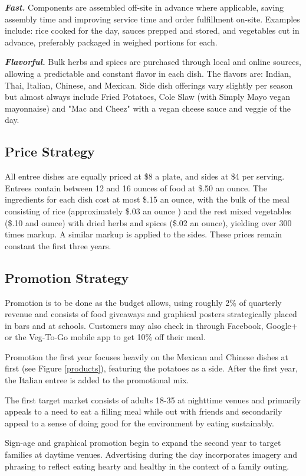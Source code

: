 \documentclass[12pt, letterpaper]{article}
\begin{document}
\textbf{\emph{Fast.}} Components are assembled off-site in advance where applicable, saving assembly time and improving service time and order fulfillment on-site. Examples include: rice cooked for the day, sauces prepped and stored, and vegetables cut in advance, preferably packaged in weighed portions for each. 

\textbf{\emph{Flavorful.}} Bulk herbs and spices are purchased through local and online sources, allowing a predictable and constant flavor in each dish.  The flavors are: Indian, Thai, Italian, Chinese, and Mexican. Side dish offerings vary slightly per season but almost always include Fried Potatoes, Cole Slaw (with Simply Mayo\textregistered{} vegan mayonnaise) and "Mac and Cheez" with a vegan cheese sauce and veggie of the day.
\subsection{Price Strategy}
All entree dishes are equally priced at \$8 a plate, and sides at \$4 per serving. Entrees contain between 12 and 16 ounces of food at \$.50 an ounce. The ingredients for each dish cost at most \$.15 an ounce, with the bulk of the meal consisting of rice (approximately \$.03 an ounce \cite{costs}) and the rest mixed vegetables (\$.10 and ounce) with dried herbs and spices (\$.02 an ounce), yielding over 300 times markup. A similar markup is applied to the sides.  These prices remain constant the first three years.
\subsection{Promotion Strategy}
Promotion is to be done as the budget allows, using roughly 2\% of quarterly revenue and consists of food giveaways and graphical posters strategically placed in bars and at schools.  Customers may also check in through Facebook, Google+ or the Veg-To-Go mobile app to get 10\% off their meal.

Promotion the first year focuses heavily on the Mexican and Chinese dishes at first (see Figure \ref{products}), featuring the potatoes as a side. After the first year, the Italian entree is added to the promotional mix.

The first target market consists of adults 18-35 at nighttime venues and primarily appeals to a need to eat a filling meal while out with friends and secondarily appeal to a sense of doing good for the environment by eating sustainably.

Sign-age and graphical promotion begin to expand the second year to target families at daytime venues.  Advertising during the day incorporates imagery and phrasing to reflect eating hearty and healthy in the context of a family outing.
\end{document}
